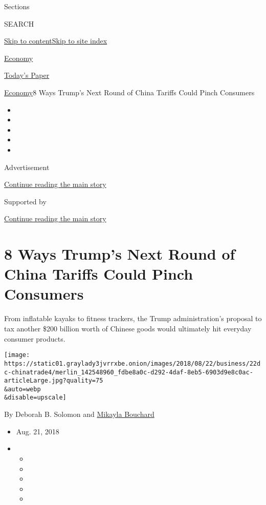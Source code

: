 Sections

SEARCH

\protect\hyperlink{site-content}{Skip to
content}\protect\hyperlink{site-index}{Skip to site index}

\href{https://www.nytimes3xbfgragh.onion/section/business/economy}{Economy}

\href{https://myaccount.nytimes3xbfgragh.onion/auth/login?response_type=cookie\&client_id=vi}{}

\href{https://www.nytimes3xbfgragh.onion/section/todayspaper}{Today's
Paper}

\href{/section/business/economy}{Economy}\textbar{}8 Ways Trump's Next
Round of China Tariffs Could Pinch Consumers

\begin{itemize}
\item
\item
\item
\item
\item
\end{itemize}

Advertisement

\protect\hyperlink{after-top}{Continue reading the main story}

Supported by

\protect\hyperlink{after-sponsor}{Continue reading the main story}

\hypertarget{8-ways-trumps-next-round-of-china-tariffs-could-pinch-consumers}{%
\section{8 Ways Trump's Next Round of China Tariffs Could Pinch
Consumers}\label{8-ways-trumps-next-round-of-china-tariffs-could-pinch-consumers}}

From inflatable kayaks to fitness trackers, the Trump administration's
proposal to tax another \$200 billion worth of Chinese goods would
ultimately hit everyday consumer products.

\texttt{[image: https://static01.graylady3jvrrxbe.onion/images/2018/08/22/business/22dc-chinatrade4/merlin\_142548960\_fdbe8a0c-d292-4daf-8eb5-6903d9e8c0ac-articleLarge.jpg?quality=75\\\&auto=webp\\\&disable=upscale]}

By Deborah B. Solomon and
\href{https://www.nytimes3xbfgragh.onion/by/mikayla-bouchard}{Mikayla
Bouchard}

\begin{itemize}
\item
  Aug. 21, 2018
\item
  \begin{itemize}
  \item
  \item
  \item
  \item
  \item
  \end{itemize}
\end{itemize}

